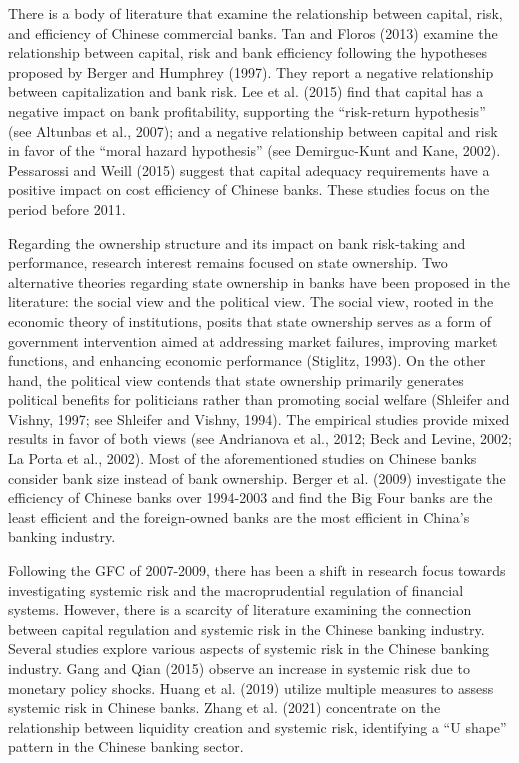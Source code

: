 \documentclass[
  12pt,
  a4paper,
]{scrreprt}
\begin{document}
There is a body of literature that examine the relationship between
capital, risk, and efficiency of Chinese commercial banks. Tan and
Floros (2013) examine the relationship between capital, risk and bank
efficiency following the hypotheses proposed by Berger and Humphrey
(1997). They report a negative relationship between capitalization and
bank risk. Lee et al. (2015) find that capital has a negative impact on
bank profitability, supporting the ``risk-return hypothesis'' (see
Altunbas et al., 2007); and a negative relationship between capital and
risk in favor of the ``moral hazard hypothesis'' (see Demirguc-Kunt and
Kane, 2002). Pessarossi and Weill (2015) suggest that capital adequacy
requirements have a positive impact on cost efficiency of Chinese banks.
These studies focus on the period before 2011.

Regarding the ownership structure and its impact on bank risk-taking and
performance, research interest remains focused on state ownership. Two
alternative theories regarding state ownership in banks have been
proposed in the literature: the social view and the political view. The
social view, rooted in the economic theory of institutions, posits that
state ownership serves as a form of government intervention aimed at
addressing market failures, improving market functions, and enhancing
economic performance (Stiglitz, 1993). On the other hand, the political
view contends that state ownership primarily generates political
benefits for politicians rather than promoting social welfare (Shleifer
and Vishny, 1997; see Shleifer and Vishny, 1994). The empirical studies
provide mixed results in favor of both views (see Andrianova et al.,
2012; Beck and Levine, 2002; La Porta et al., 2002). Most of the
aforementioned studies on Chinese banks consider bank size instead of
bank ownership. Berger et al. (2009) investigate the efficiency of
Chinese banks over 1994-2003 and find the Big Four banks are the least
efficient and the foreign-owned banks are the most efficient in China's
banking industry.

Following the GFC of 2007-2009, there has been a shift in research focus
towards investigating systemic risk and the macroprudential regulation
of financial systems. However, there is a scarcity of literature
examining the connection between capital regulation and systemic risk in
the Chinese banking industry. Several studies explore various aspects of
systemic risk in the Chinese banking industry. Gang and Qian (2015)
observe an increase in systemic risk due to monetary policy shocks.
Huang et al. (2019) utilize multiple measures to assess systemic risk in
Chinese banks. Zhang et al. (2021) concentrate on the relationship
between liquidity creation and systemic risk, identifying a ``U shape''
pattern in the Chinese banking sector.
\end{document}
